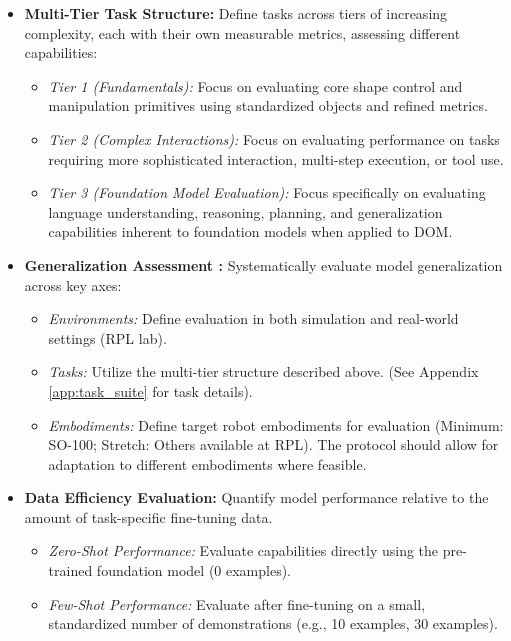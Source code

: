 \begin{itemize}
    \item \textbf{Multi-Tier Task Structure:} Define tasks across tiers of increasing complexity, each with their own measurable metrics, assessing different capabilities:
        \begin{itemize}
            \item \textit{Tier 1 (Fundamentals):} Focus on evaluating core shape control and manipulation primitives using standardized objects and refined metrics.
            \item \textit{Tier 2 (Complex Interactions):} Focus on evaluating performance on tasks requiring more sophisticated interaction, multi-step execution, or tool use.
            \item \textit{Tier 3 (Foundation Model Evaluation):} Focus specifically on evaluating language understanding, reasoning, planning, and generalization capabilities inherent to foundation models when applied to DOM.
        \end{itemize}
    \item \textbf{Generalization Assessment \cite{TransferWelle}:} Systematically evaluate model generalization across key axes:
        \begin{itemize}
            \item \textit{Environments:} Define evaluation in both simulation and real-world settings (RPL lab).
            \item \textit{Tasks:} Utilize the multi-tier structure described above. (See Appendix \ref{app:task_suite} for task details).
            \item \textit{Embodiments:} Define target robot embodiments for evaluation (Minimum: SO-100; Stretch: Others available at RPL). The protocol should allow for adaptation to different embodiments where feasible.
        \end{itemize}
    \item \textbf{Data Efficiency Evaluation:} Quantify model performance relative to the amount of task-specific fine-tuning data.
        \begin{itemize}
            \item \textit{Zero-Shot Performance:} Evaluate capabilities directly using the pre-trained foundation model (0 examples).
            \item \textit{Few-Shot Performance:} Evaluate after fine-tuning on a small, standardized number of demonstrations (e.g., 10 examples, 30 examples).
        \end{itemize}
\end{itemize}

